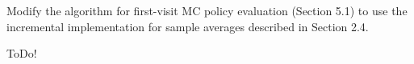 
\begin{exercise}[Exercise 5.9]

Modify the algorithm for first-visit MC policy evaluation (Section 5.1) to use the incremental implementation for sample averages described in Section 2.4.

\end{exercise}


\begin{solution}

ToDo!

\end{solution}

